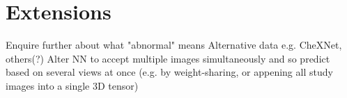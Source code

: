 \documentclass[11pt]{article} %
\theoremstyle{plain}
\theoremstyle{definition}
\begin{document}


\newpage
\section{Extensions}
Enquire further about what "abnormal" means
Alternative data e.g. CheXNet, others(?)
Alter NN to accept multiple images simultaneously and so predict based on several views at once (e.g. by weight-sharing, or appening all study images into a single 3D tensor)



\clearpage


\end{document}
